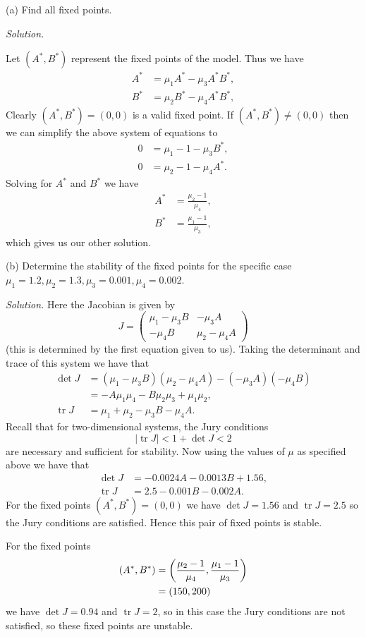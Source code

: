 \documentclass{article}
\DeclareMathOperator{\tr}{tr}
\newcommand{\As}{A^*}
\newcommand{\Bs}{B^*}
\begin{document}
(a) Find all fixed points.

\textit{Solution.}

Let $(\As, \Bs)$ represent the fixed points of the model. Thus we have
%
\begin{align*}
    \As &= \mu_1 \As - \mu_3 \As \Bs, \\
    \Bs &= \mu_2 \Bs - \mu_4 \As \Bs,
\end{align*}
%
Clearly $(\As, \Bs) = (0, 0)$ is a valid fixed point.
If $(\As, \Bs) \neq (0, 0)$ then we can simplify the above system of equations to
%
\begin{align*}
    0 &= \mu_1 - 1 - \mu_3 \Bs, \\
    0 &= \mu_2 - 1 - \mu_4 \As.
\end{align*}
%
Solving for $\As$ and $\Bs$ we have
%
\begin{align*}
    \As &= \frac{\mu_2 - 1}{\mu_4}, \\
    \Bs &= \frac{\mu_1 - 1}{\mu_3},
\end{align*}
%
which gives us our other solution.


\vspace{5mm}

(b) Determine the stability of the fixed points for the specific case
$\mu_1 = 1.2, \mu_2 = 1.3, \mu_3 = 0.001, \mu_4 = 0.002$.

\textit{Solution.}
Here the Jacobian is given by
%
\begin{equation*}
    J =
        \begin{pmatrix}
            \mu_1 - \mu_3 B & -\mu_3 A \\
            - \mu_4 B & \mu_2 - \mu_4 A
        \end{pmatrix}
\end{equation*}
%
(this is determined by the first equation given to us).
Taking the determinant and trace of this system we have that
%
\begin{align*}
    \det J &= (\mu_1 - \mu_3 B) (\mu_2 - \mu_4 A) - (- \mu_3 A) (- \mu_4 B) \\
           &= -A \mu_1 \mu_4 - B \mu_2 \mu_3 + \mu_1 \mu_2
           ,
           \\
    \tr J &= \mu_1 + \mu_2 - \mu_3 B - \mu_4 A
    .
\end{align*}
%
Recall that for two-dimensional systems, the Jury conditions
%
\begin{equation*}
    |\tr J| < 1 + \det J < 2
\end{equation*}
%
are necessary and sufficient for stability. Now using the values of $\mu$
as specified above we have that
%
\begin{align*}
    \det J &= - 0.0024 A - 0.0013 B + 1.56, \\
    \tr J &= 2.5 - 0.001 B - 0.002 A
    .
\end{align*}
%
For the fixed points $(\As, \Bs) = (0, 0)$ we have $\det J = 1.56$ and
$\tr J = 2.5$ so the Jury conditions are satisfied. Hence this pair of
fixed points is stable.

For the fixed points
%
\begin{align*}
    (\As, \Bs)
        &= \del{\frac{\mu_2 - 1}{\mu_4}, \frac{\mu_1 - 1}{\mu_3}} \\
        &= (150, 200)
\end{align*}
%
we have $\det J = 0.94$ and $\tr J = 2$, so in this case the Jury
conditions are not satisfied, so these fixed points are unstable.
\end{document}
